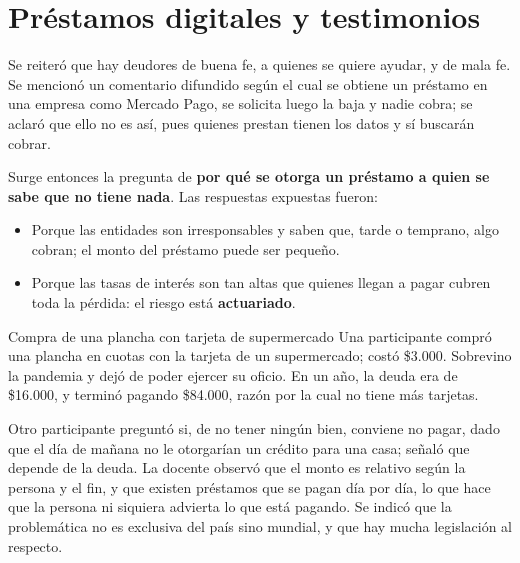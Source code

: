 \documentclass[12pt,oneside]{book}
\begin{document}
\section{Préstamos digitales y testimonios}

Se reiteró que hay deudores de buena fe, a quienes se quiere ayudar, y de mala fe. Se mencionó un comentario difundido según el cual se obtiene un préstamo en una empresa como Mercado Pago, se solicita luego la baja y nadie cobra; se aclaró que ello no es así, pues quienes prestan tienen los datos y sí buscarán cobrar.

Surge entonces la pregunta de \textbf{por qué se otorga un préstamo a quien se sabe que no tiene nada}. Las respuestas expuestas fueron:

\begin{itemize}
    \item Porque las entidades son irresponsables y saben que, tarde o temprano, algo cobran; el monto del préstamo puede ser pequeño.
    \item Porque las tasas de interés son tan altas que quienes llegan a pagar cubren toda la pérdida: el riesgo está \textbf{actuariado}.
\end{itemize}

\begin{example}{Compra de una plancha con tarjeta de supermercado}
Una participante compró una plancha en cuotas con la tarjeta de un supermercado; costó \$3.000. Sobrevino la pandemia y dejó de poder ejercer su oficio. En un año, la deuda era de \$16.000, y terminó pagando \$84.000, razón por la cual no tiene más tarjetas.
\end{example}

Otro participante preguntó si, de no tener ningún bien, conviene no pagar, dado que el día de mañana no le otorgarían un crédito para una casa; señaló que depende de la deuda. La docente observó que el monto es relativo según la persona y el fin, y que existen préstamos que se pagan día por día, lo que hace que la persona ni siquiera advierta lo que está pagando. Se indicó que la problemática no es exclusiva del país sino mundial, y que hay mucha legislación al respecto.
\end{document}
